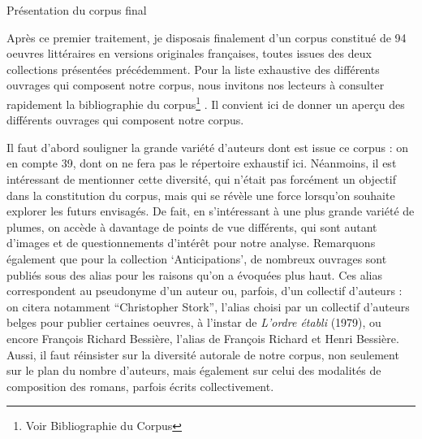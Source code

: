 \documentclass[letterpaper,portrait,12pt]{article}
\begin{document}
	Pr\'{e}sentation du corpus final





	Apr\`{e}s ce premier traitement, je disposais finalement d'un corpus constitu\'{e} de 94 oeuvres litt\'{e}raires en versions originales fran\c{c}aises, toutes issues des deux collections pr\'{e}sent\'{e}es pr\'{e}c\'{e}demment. Pour la liste exhaustive des diff\'{e}rents ouvrages qui composent notre corpus, nous invitons nos lecteurs \`{a} consulter rapidement la bibliographie du corpus\footnote{	Voir Bibliographie du Corpus} . Il convient ici de donner un aper\c{c}u des diff\'{e}rents ouvrages qui composent notre corpus.





	Il faut d'abord souligner la grande vari\'{e}t\'{e} d'auteurs dont est issue ce corpus : on en compte 39, dont on ne fera pas le r\'{e}pertoire exhaustif ici. N\'{e}anmoins, il est int\'{e}ressant de mentionner cette diversit\'{e}, qui n'\'{e}tait pas forc\'{e}ment un objectif dans la constitution du corpus, mais qui se r\'{e}v\`{e}le une force lorsqu'on souhaite explorer les futurs envisag\'{e}s. De fait, en s'int\'{e}ressant \`{a} une plus grande vari\'{e}t\'{e} de plumes, on acc\`{e}de \`{a} davantage de points de vue diff\'{e}rents, qui sont autant d'images et de questionnements d'int\'{e}r\^{e}t pour notre analyse. Remarquons \'{e}galement que pour la collection {`}Anticipations', de nombreux ouvrages sont publi\'{e}s sous des alias pour les raisons qu'on a \'{e}voqu\'{e}es plus haut. Ces alias correspondent au pseudonyme d'un auteur ou, parfois, d'un collectif d'auteurs : on citera notamment {``}Christopher Stork'', l'alias choisi par un collectif d'auteurs belges pour publier certaines oeuvres, \`{a} l'instar de \emph{L'ordre \'{e}tabli }(1979), ou encore Fran\c{c}ois Richard Bessi\`{e}re, l'alias de Fran\c{c}ois Richard et Henri Bessi\`{e}re. Aussi, il faut r\'{e}insister sur la diversit\'{e} autorale de notre corpus, non seulement sur le plan du nombre d'auteurs, mais \'{e}galement sur celui des modalit\'{e}s de composition des romans, parfois \'{e}crits collectivement. 
\end{document}
